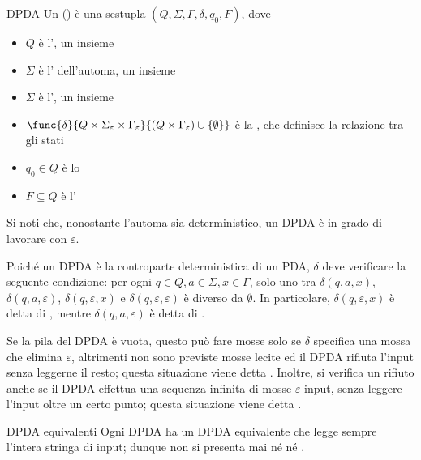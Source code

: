 \documentclass[a4paper, 12pt]{report}
\begin{document}
    \begin{frameddefn}{DPDA}
        Un  () è una sestupla $(Q, \Sigma, \Gamma, \delta, q_0, F)$, dove

        \begin{itemize}
            \item $Q$ è l', un insieme 
            \item $\Sigma$ è l' dell'automa, un insieme 
            \item $\Sigma$ è l', un insieme 
            \item $\func{\delta}{Q \times \Sigma_\varepsilon \times \Gamma_\varepsilon}{(Q \times \Gamma_\varepsilon) \cup \{\emptyset \}}$ è la , che definisce la relazione tra gli stati
            \item $q_0 \in Q$ è lo 
            \item $F \subseteq Q$ è l'
        \end{itemize}

        Si noti che, nonostante l'automa sia deterministico, un DPDA è in grado di lavorare con $\varepsilon$.

        Poiché un DPDA è la controparte deterministica di un PDA, $\delta$ deve verificare la seguente condizione: per ogni $q \in Q, a \in \Sigma, x \in \Gamma$, solo uno tra $\delta(q, a, x)$, $\delta(q, a, \varepsilon)$, $\delta(q, \varepsilon, x)$ e $\delta(q, \varepsilon, \varepsilon)$ è diverso da $\emptyset$. In particolare, $\delta(q, \varepsilon, x)$ è detta  di , mentre $\delta(q, a, \varepsilon)$ è detta  di .

        Se la pila del DPDA è vuota, questo può fare mosse solo se $\delta$ specifica una mossa che elimina $\varepsilon$, altrimenti non sono previste mosse lecite ed il DPDA rifiuta l'input senza leggerne il resto; questa situazione viene detta . Inoltre, si verifica un rifiuto anche se il DPDA effettua una sequenza infinita di mosse $\varepsilon$-input, senza leggere l'input oltre un certo punto; questa situazione viene detta .
    \end{frameddefn}

    \begin{framedlem}{DPDA equivalenti}
        Ogni DPDA ha un DPDA equivalente che legge sempre l'intera stringa di input; dunque non si presenta mai né  né .
    \end{framedlem}
\end{document}
